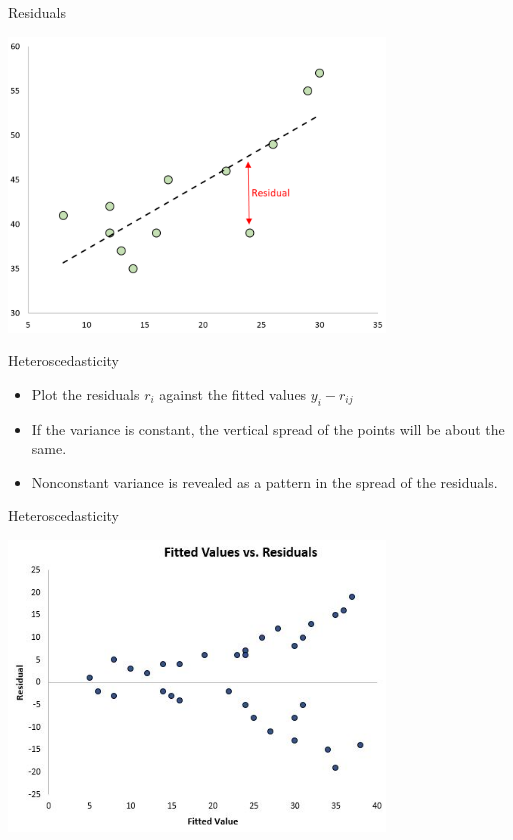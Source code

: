 \documentclass{beamer}
\begin{document}
\begin{frame}{Residuals}

\begin{center}
     \includegraphics[width=10cm]{../tex/figures/residuals1-1.png}
\end{center}

\end{frame}

\begin{frame}{Heteroscedasticity}
	\begin{itemize}
		\item Plot the residuals $r_{i}$ against the fitted values $y_{i} - r_{ij}$ 
		\item If the variance is constant, the vertical spread of the points will be about the same. 
		\item Nonconstant variance is revealed as a pattern in the spread of the residuals.
	\end{itemize}
\end{frame}

\begin{frame}{Heteroscedasticity}
\begin{center}
     \includegraphics[width=10cm]{../tex/figures/heteroscedastisity.jpg}
\end{center}
\end{frame}
\end{document}
